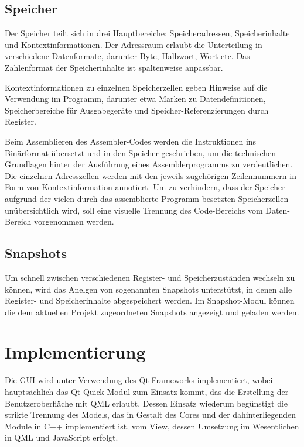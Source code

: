 \subsection{Speicher}

Der Speicher teilt sich in drei Hauptbereiche: Speicheradressen, Speicherinhalte und Kontextinformationen.
Der Adressraum erlaubt die Unterteilung in verschiedene Datenformate, darunter Byte, Halbwort, Wort etc.
Das Zahlenformat der Speicherinhalte ist spaltenweise anpassbar.

Kontextinformationen zu einzelnen Speicherzellen geben Hinweise auf die Verwendung im Programm, darunter etwa Marken zu Datendefinitionen, Speicherbereiche für Ausgabegeräte und Speicher-Referenzierungen durch Register.

Beim Assemblieren des Assembler-Codes werden die Instruktionen ins Binärformat übersetzt und in den Speicher geschrieben, um die technischen Grundlagen hinter der Ausführung eines Assemblerprogramms zu verdeutlichen. Die einzelnen Adresszellen werden mit den jeweils zugehörigen Zeilennummern in Form von Kontextinformation annotiert. Um zu verhindern, dass der Speicher aufgrund der vielen durch das assemblierte Programm besetzten Speicherzellen unübersichtlich wird, soll eine visuelle Trennung des Code-Bereichs vom Daten-Bereich vorgenommen werden.

\subsection{Snapshots}

Um schnell zwischen verschiedenen Register- und Speicherzuständen wechseln zu können, wird das Anelgen von sogenannten Snapshots unterstützt, in denen alle Register- und Speicherinhalte abgespeichert werden. Im Snapshot-Modul können die dem aktuellen Projekt zugeordneten Snapshots angezeigt und geladen werden.

\section{Implementierung}

Die GUI wird unter Verwendung des Qt-Frameworks implementiert, wobei hauptsächlich das Qt Quick-Modul zum Einsatz kommt, das die Erstellung der Benutzeroberfläche mit QML erlaubt. Dessen Einsatz wiederum begünstigt die strikte Trennung des Models, das in Gestalt des Cores und der dahinterliegenden Module in C++ implementiert ist, vom View, dessen Umsetzung im Wesentlichen in QML und JavaScript erfolgt.

